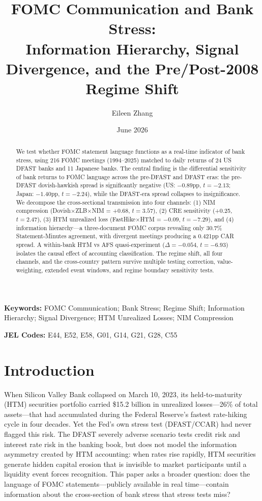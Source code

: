 \documentclass[12pt,a4paper]{article}
\title{\color{primary}\textbf{FOMC Communication and Bank Stress:\\ Information Hierarchy, Signal Divergence, and the Pre/Post-2008 Regime Shift}}
\author{Eileen Zhang}
\date{June 2026}
\begin{document}
\maketitle

\begin{abstract}
We test whether FOMC statement language functions as a real-time indicator of bank stress, using 216 FOMC meetings (1994--2025) matched to daily returns of 24 US DFAST banks and 11 Japanese banks. The central finding is the differential sensitivity of bank returns to FOMC language across the pre-DFAST and DFAST eras: the pre-DFAST dovish-hawkish spread is significantly negative (US: $-0.89$pp, $t = -2.13$; Japan: $-1.40$pp, $t = -2.24$), while the DFAST-era spread collapses to insignificance. We decompose the cross-sectional transmission into four channels: (1) NIM compression (Dovish$\times$ZLB$\times$NIM = +0.68, $t = 3.57$), (2) CRE sensitivity (+0.25, $t = 2.47$), (3) HTM unrealized loss (FastHike$\times$HTM = $-0.09$, $t = -7.29$), and (4) information hierarchy---a three-document FOMC corpus revealing only 30.7\% Statement-Minutes agreement, with divergent meetings producing a 0.421pp CAR spread. A within-bank HTM vs AFS quasi-experiment ($\Delta = -0.054$, $t = -6.93$) isolates the causal effect of accounting classification. The regime shift, all four channels, and the cross-country pattern survive multiple testing correction, value-weighting, extended event windows, and regime boundary sensitivity tests.
\end{abstract}

\noindent\textbf{Keywords:} FOMC Communication; Bank Stress; Regime Shift; Information Hierarchy; Signal Divergence; HTM Unrealized Losses; NIM Compression

\noindent\textbf{JEL Codes:} E44, E52, E58, G01, G14, G21, G28, C55

\newpage

\section{Introduction}

When Silicon Valley Bank collapsed on March 10, 2023, its held-to-maturity (HTM) securities portfolio carried \$15.2 billion in unrealized losses---26\% of total assets---that had accumulated during the Federal Reserve's fastest rate-hiking cycle in four decades. Yet the Fed's own stress test (DFAST/CCAR) had never flagged this risk. The DFAST severely adverse scenario tests credit risk and interest rate risk in the banking book, but does not model the information asymmetry created by HTM accounting: when rates rise rapidly, HTM securities generate hidden capital erosion that is invisible to market participants until a liquidity event forces recognition. This paper asks a broader question: does the language of FOMC statements---publicly available in real time---contain information about the cross-section of bank stress that stress tests miss?
\end{document}
